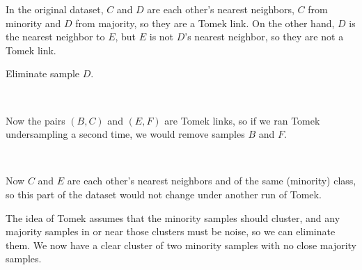 In the original dataset, $C$ and $D$ are each other's nearest neighbors, $C$ from minority and $D$ from majority, so they are a Tomek link.   On the other hand, $D$ is the nearest neighbor to $E$, but $E$ is not $D$'s nearest neighbor, so they are not a Tomek link.  

Eliminate sample $D$.  

\

\noindent\hfil{}

Now the pairs $(B,C)$ and $(E,F)$ are Tomek links, so if we ran Tomek undersampling a second time, we would remove samples $B$ and $F$.  

\

\noindent\hfil{}

Now $C$ and $E$ are each other's nearest neighbors and of the same (minority) class, so this part of the dataset would not change under another run of Tomek.  

The idea of Tomek assumes that the minority samples should cluster, and any majority samples in or near those clusters must be noise, so we can eliminate them.  We now have a clear cluster of two minority samples with no close majority samples.  

